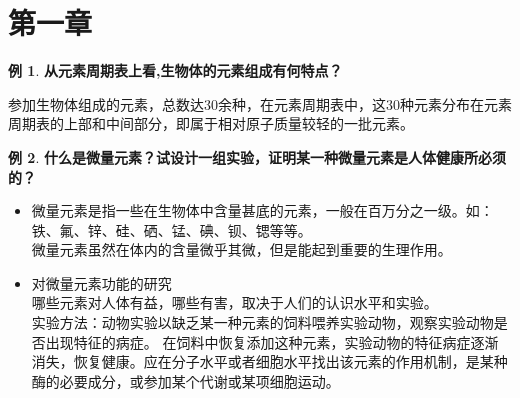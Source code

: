 \documentclass[UTF8]{article}
\theoremstyle{definition}
\newtheorem{example}{例}[section]
\begin{document}
\section{第一章}
\begin{example}\textbf{从元素周期表上看,生物体的元素组成有何特点？}
    
    参加生物体组成的元素，总数达30余种，在元素周期表中，这30种元素分布在元素周期表的上部和中间部分，即属于相对原子质量较轻的一批元素。
\end{example}
\begin{example}\textbf{什么是微量元素？试设计一组实验，证明某一种微量元素是人体健康所必须的？}
    
    \begin{itemize}
        \item 微量元素是指一些在生物体中含量甚底的元素，一般在百万分之一级。如：铁、氟、锌、硅、硒、锰、碘、钡、锶等等。\\ 微量元素虽然在体内的含量微乎其微，但是能起到重要的生理作用。
        \item 对微量元素功能的研究\\ 哪些元素对人体有益，哪些有害，取决于人们的认识水平和实验。\\ 实验方法：动物实验以缺乏某一种元素的饲料喂养实验动物，观察实验动物是否出现特征的病症。 在饲料中恢复添加这种元素，实验动物的特征病症逐渐消失，恢复健康。应在分子水平或者细胞水平找出该元素的作用机制，是某种酶的必要成分，或参加某个代谢或某项细胞运动。
    \end{itemize}
\end{example}
\end{document}
